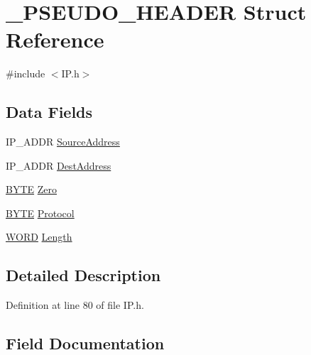 \hypertarget{struct___p_s_e_u_d_o___h_e_a_d_e_r}{}\section{\+\_\+\+P\+S\+E\+U\+D\+O\+\_\+\+H\+E\+A\+D\+E\+R Struct Reference}
\label{struct___p_s_e_u_d_o___h_e_a_d_e_r}


{\ttfamily \#include $<$I\+P.\+h$>$}

\subsection*{Data Fields}
\begin{DoxyCompactItemize}
\item 
I\+P\+\_\+\+A\+D\+D\+R \hyperlink{struct___p_s_e_u_d_o___h_e_a_d_e_r_a89fa95e930f178cad3eae53104b93622}{Source\+Address}
\item 
I\+P\+\_\+\+A\+D\+D\+R \hyperlink{struct___p_s_e_u_d_o___h_e_a_d_e_r_a3116a419f3c363294726255181ca77c7}{Dest\+Address}
\item 
\hyperlink{_generic_type_defs_8h_a4ae1dab0fb4b072a66584546209e7d58}{B\+Y\+T\+E} \hyperlink{struct___p_s_e_u_d_o___h_e_a_d_e_r_aa6d4c439169ac792940a0ba329d64e25}{Zero}
\item 
\hyperlink{_generic_type_defs_8h_a4ae1dab0fb4b072a66584546209e7d58}{B\+Y\+T\+E} \hyperlink{struct___p_s_e_u_d_o___h_e_a_d_e_r_a4e3381dd4fcd372f6f4fb0b2577e541a}{Protocol}
\item 
\hyperlink{_generic_type_defs_8h_a2b0e863dadf920709ec53d9088ee7c91}{W\+O\+R\+D} \hyperlink{struct___p_s_e_u_d_o___h_e_a_d_e_r_a716d105478dd9de36ec29bc981795f47}{Length}
\end{DoxyCompactItemize}


\subsection{Detailed Description}


Definition at line 80 of file I\+P.\+h.



\subsection{Field Documentation}
\hypertarget{struct___p_s_e_u_d_o___h_e_a_d_e_r_a3116a419f3c363294726255181ca77c7}{}
